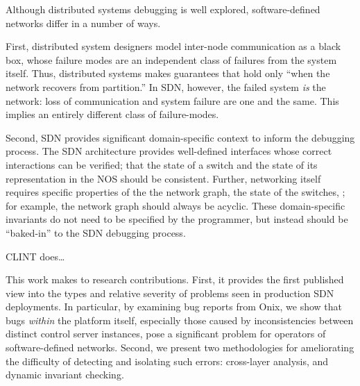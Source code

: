             Although distributed systems debugging is well explored,
            software-defined networks differ in a number of ways.

             
                    First, distributed system designers model inter-node communication as a black box, whose failure modes are an independent class of failures from the system itself.
                    Thus, distributed systems makes guarantees that hold only ``when the network recovers from partition.''
                    In SDN, however, the failed system {\it is} the network: loss of
                    communication and system failure are one and the same. This implies an
                    entirely different class of failure-modes.

                    Second, SDN provides significant domain-specific context to inform the debugging process.
                    The  SDN architecture provides well-defined interfaces whose correct interactions can be verified; \eg{} that the state of a switch and the state of its representation in the NOS should be consistent.
                    Further, networking itself requires specific properties of the the network graph, the state of the switches, \etc{}; for example, the network graph should always be acyclic.
                    These domain-specific invariants do not need to be specified by the programmer, but instead should be ``baked-in'' to the SDN debugging process.

                    CLINT does\ldots

                    This work makes to research contributions. First, it provides the first
                    published view into the types and relative severity of problems seen in production SDN deployments. In particular, by
                    examining bug reports from Onix, we show that bugs {\it within} the platform
                    itself, especially those caused by inconsistencies between distinct control server
                    instances, pose a significant problem for operators of software-defined
                    networks. Second, we present two methodologies for ameliorating the difficulty of
                    detecting and isolating such errors: cross-layer analysis, and dynamic invariant checking.
